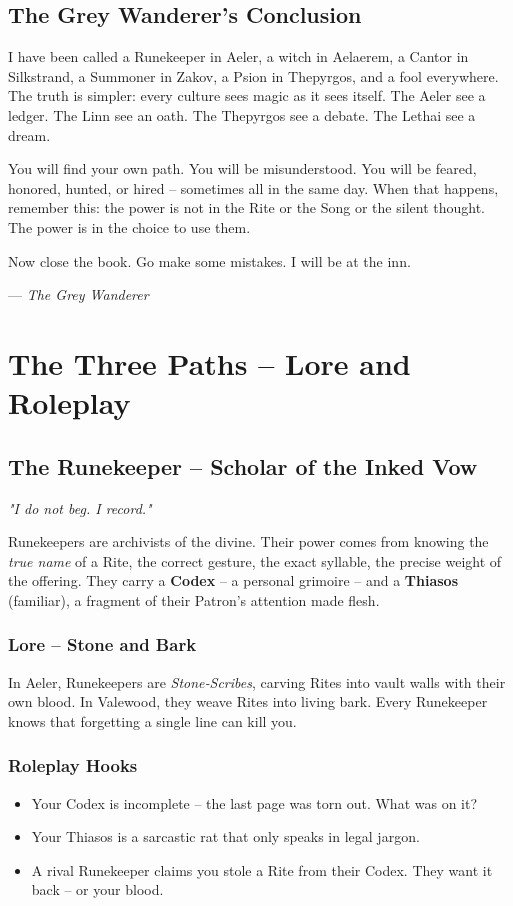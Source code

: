 \documentclass[10pt,a5paper]{book}
\begin{document}
\section{The Grey Wanderer's Conclusion}

I have been called a Runekeeper in Aeler, a witch in Aelaerem, a Cantor in Silkstrand, a Summoner in Zakov, a Psion in Thepyrgos, and a fool everywhere. The truth is simpler: every culture sees magic as it sees itself. The Aeler see a ledger. The Linn see an oath. The Thepyrgos see a debate. The Lethai see a dream.

You will find your own path. You will be misunderstood. You will be feared, honored, hunted, or hired -- sometimes all in the same day. When that happens, remember this: the power is not in the Rite or the Song or the silent thought. The power is in the choice to use them.

Now close the book. Go make some mistakes. I will be at the inn.

\vspace{0.5cm}
\hfill --- \textit{The Grey Wanderer}


\chapter{The Three Paths -- Lore and Roleplay}

\section{The Runekeeper -- Scholar of the Inked Vow}
\textit{"I do not beg. I record."}

Runekeepers are archivists of the divine. Their power comes from knowing the \textit{true name} of a Rite, the correct gesture, the exact syllable, the precise weight of the offering. They carry a \textbf{Codex} -- a personal grimoire -- and a \textbf{Thiasos} (familiar), a fragment of their Patron's attention made flesh.

\subsection{Lore -- Stone and Bark}
In Aeler, Runekeepers are \textit{Stone‑Scribes}, carving Rites into vault walls with their own blood. In Valewood, they weave Rites into living bark. Every Runekeeper knows that forgetting a single line can kill you.

\subsection{Roleplay Hooks}
\begin{itemize}
    \item Your Codex is incomplete -- the last page was torn out. What was on it?
    \item Your Thiasos is a sarcastic rat that only speaks in legal jargon.
    \item A rival Runekeeper claims you stole a Rite from their Codex. They want it back -- or your blood.
\end{itemize}
\end{document}
